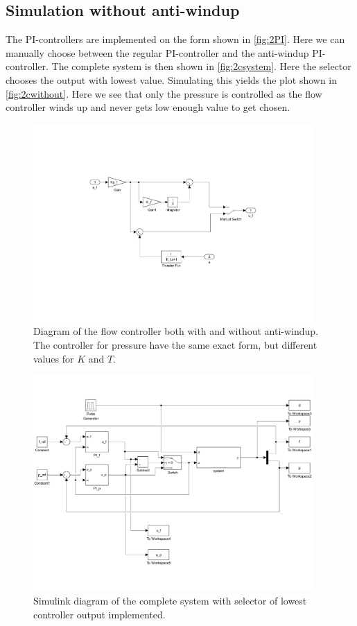\documentclass[a4paper]{scrartcl}
\begin{document}
\subsection{Simulation without anti-windup}
The PI-controllers are implemented on the form shown in \autoref{fig:2PI}. Here we can manually choose between the regular PI-controller and the anti-windup PI-controller. The complete system is then shown in \autoref{fig:2csystem}. Here the selector chooses the output with lowest value. Simulating this yields the plot shown in \autoref{fig:2cwithout}. Here we see that only the pressure is controlled as the flow controller winds up and never gets low enough value to get chosen.

\begin{figure}[ht!]
	\centering
	\includegraphics[width=0.95\textwidth]{fig/simulink/PI_controller_task2_combined.pdf}
	\caption{Diagram of the flow controller both with and without anti-windup. The controller for pressure have the same exact form, but different values for $K$ and $T$.}
	\label{fig:2PI}
\end{figure}
\begin{figure}[ht!]
	\centering
	\includegraphics[width=0.95\textwidth]{fig/simulink/system_task2.pdf}
	\caption{Simulink diagram of the complete system with selector of lowest controller output implemented.}
	\label{fig:2csystem}
\end{figure}
\end{document}

